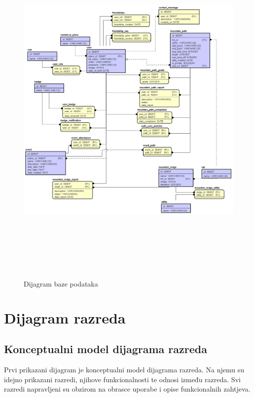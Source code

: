 				\begin{figure}[H]
					\includegraphics[scale=0.4, height=180mm]{dijagrami/ER_Diagram.png} %
					\centering
					\caption{Dijagram baze podataka}
					\label{fig:dijagrambp}
				\end{figure}
			
			\eject
			
			
		\section{Dijagram razreda}
		
			\subsection{Konceptualni model dijagrama razreda}
			Prvi prikazani dijagram je konceptualni model dijagrama razreda. Na njemu su idejno prikazani razredi, njihove funkcionalnosti te odnosi između razreda. Svi razredi napravljeni su obzirom na obrasce uporabe i opise funkcionalnih zahtjeva.
		
